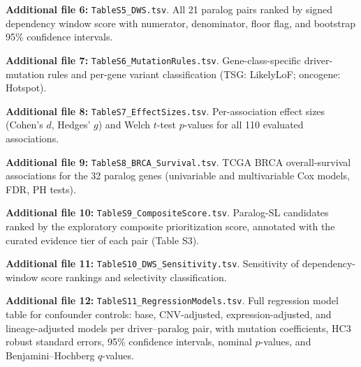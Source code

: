 \documentclass[11pt,a4paper]{article}
\begin{document}
\noindent\textbf{Additional file 6:} \texttt{TableS5\_DWS.tsv}. All 21 paralog pairs ranked by signed dependency window score with numerator, denominator, floor flag, and bootstrap 95\% confidence intervals.

\noindent\textbf{Additional file 7:} \texttt{TableS6\_MutationRules.tsv}. Gene-class-specific driver-mutation rules and per-gene variant classification (TSG: LikelyLoF; oncogene: Hotspot).

\noindent\textbf{Additional file 8:} \texttt{TableS7\_EffectSizes.tsv}. Per-association effect sizes (Cohen's $d$, Hedges' $g$) and Welch $t$-test $p$-values for all 110 evaluated associations.

\noindent\textbf{Additional file 9:} \texttt{TableS8\_BRCA\_Survival.tsv}. TCGA BRCA overall-survival associations for the 32 paralog genes (univariable and multivariable Cox models, FDR, PH tests).

\noindent\textbf{Additional file 10:} \texttt{TableS9\_CompositeScore.tsv}. Paralog-SL candidates ranked by the exploratory composite prioritization score, annotated with the curated evidence tier of each pair (Table S3).

\noindent\textbf{Additional file 11:} \texttt{TableS10\_DWS\_Sensitivity.tsv}. Sensitivity of dependency-window score rankings and selectivity classification.

\noindent\textbf{Additional file 12:} \texttt{TableS11\_RegressionModels.tsv}. Full regression model table for confounder controls: base, CNV-adjusted, expression-adjusted, and lineage-adjusted models per driver--paralog pair, with mutation coefficients, HC3 robust standard errors, 95\% confidence intervals, nominal $p$-values, and Benjamini--Hochberg $q$-values.
\end{document}
